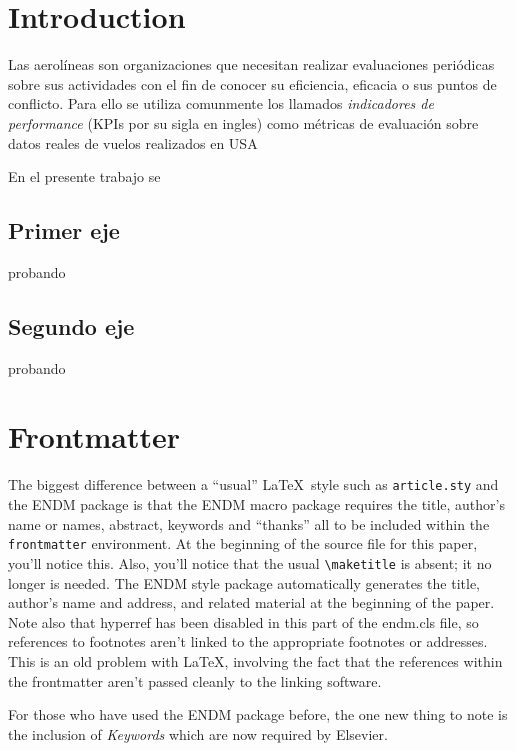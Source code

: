 \documentclass{endm}
\begin{document}
\section{Introduction}\label{intro}

Las aerol\'ineas son organizaciones que necesitan realizar evaluaciones peri\'odicas sobre sus actividades
con el fin de conocer su eficiencia, eficacia o sus puntos de conflicto. Para ello se utiliza comunmente los 
llamados \textit{indicadores de performance} (KPIs por su sigla en ingles) como m\'etricas de evaluaci\'on sobre datos reales de vuelos realizados en USA

En el presente trabajo se 

\subsection{Primer eje}
	probando
\subsection{Segundo eje}
	probando
\section{Frontmatter}

The biggest difference between a ``usual'' \LaTeX\ style such as
\texttt{article.sty} and the ENDM package is that the ENDM macro
package requires the title, author's name or names, abstract, keywords
and ``thanks'' all to be included within the \texttt{frontmatter}
environment. At the beginning of the source file for this paper, you'll
notice this. Also, you'll notice that the usual \verb+\maketitle+ is
absent; it no longer is needed. The ENDM style package automatically
generates the title, author's name and address, and related material at
the beginning of the paper. Note also that hyperref has been disabled in
this part of the endm.cls file, so references to footnotes aren't linked
to the appropriate footnotes or addresses. This is an old problem with
\LaTeX, involving the fact that the references within the frontmatter
aren't passed cleanly to the linking software.

For those who have used the ENDM package before, the one new thing to
note is the inclusion of \emph{Keywords} which are now required by
Elsevier.
\end{document}
